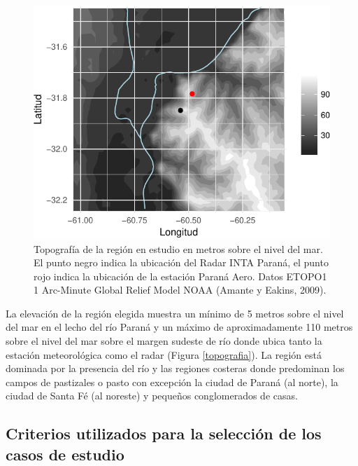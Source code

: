 \documentclass[12pt,spanish,oneside, a4paper]{book}
\begin{document}
\begin{figure}

{\centering \includegraphics{Tesis_files/figure-latex/topografia-1} 

}

\caption[Topografía de la región en estudio en metros sobre el nivel del mar.]{Topografía de la región en estudio en metros sobre el nivel del mar. El punto negro indica la ubicación del Radar INTA Paraná, el punto rojo indica la ubicación de la estación Paraná Aero. Datos ETOPO1 1 Arc-Minute Global Relief Model NOAA (Amante y Eakins, 2009). \label{topografia}}\label{fig:topografia}
\end{figure}

La elevación de la región elegida muestra un mínimo de 5 metros sobre el
nivel del mar en el lecho del río Paraná y un máximo de aproximadamente
110 metros sobre el nivel del mar sobre el margen sudeste de río donde
ubica tanto la estación meteorológica como el radar (Figura
\ref{topografia}). La región está dominada por la presencia del río y
las regiones costeras donde predominan los campos de pastizales o pasto
con excepción la ciudad de Paraná (al norte), la ciudad de Santa Fé (al
noreste) y pequeños conglomerados de casas.

\subsection{\texorpdfstring{Criterios utilizados para la selección de
los casos de estudio
\label{sec-criterios}}{Criterios utilizados para la selección de los casos de estudio }}\label{criterios-utilizados-para-la-seleccion-de-los-casos-de-estudio}
\end{document}
